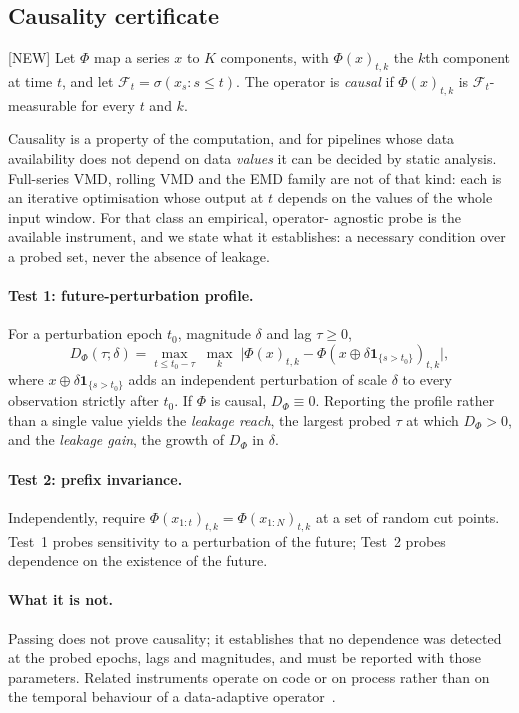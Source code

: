 \documentclass[review,3p,times]{elsarticle}
\begin{document}
\subsection{Causality certificate}\label{sec:certificate}
\textsf{[NEW]} Let $\Phi$ map a series $x$ to $K$ components, with
$\Phi(x)_{t,k}$ the $k$th component at time $t$, and let
$\mathcal F_t=\sigma(x_s: s\le t)$. The operator is \emph{causal} if
$\Phi(x)_{t,k}$ is $\mathcal F_t$-measurable for every $t$ and $k$.

Causality is a property of the computation, and for pipelines whose data
availability does not depend on data \emph{values} it can be decided by static
analysis. Full-series VMD, rolling VMD and the EMD family are not of that
kind: each is an iterative optimisation whose output at $t$ depends on the
values of the whole input window. For that class an empirical, operator-
agnostic probe is the available instrument, and we state what it establishes:
a necessary condition over a probed set, never the absence of leakage.

\paragraph{Test 1: future-perturbation profile.}
For a perturbation epoch $t_0$, magnitude $\delta$ and lag $\tau\ge0$,
\begin{equation}
D_\Phi(\tau;\delta)=
\max_{t\le t_0-\tau}\;\max_k\;
\bigl|\Phi(x)_{t,k}-\Phi\!\left(x\oplus\delta\mathbf 1_{\{s>t_0\}}\right)_{t,k}\bigr| ,
\label{eq:profile}
\end{equation}
where $x\oplus\delta\mathbf 1_{\{s>t_0\}}$ adds an independent perturbation of
scale $\delta$ to every observation strictly after $t_0$. If $\Phi$ is causal,
$D_\Phi\equiv0$. Reporting the profile rather than a single value yields the
\emph{leakage reach}, the largest probed $\tau$ at which $D_\Phi>0$, and the
\emph{leakage gain}, the growth of $D_\Phi$ in $\delta$.

\paragraph{Test 2: prefix invariance.}
Independently, require $\Phi(x_{1:t})_{t,k}=\Phi(x_{1:N})_{t,k}$ at a set of
random cut points. Test~1 probes sensitivity to a perturbation of the future;
Test~2 probes dependence on the existence of the future.

\paragraph{What it is not.} Passing does not prove causality; it establishes
that no dependence was detected at the probed epochs, lags and magnitudes, and
must be reported with those parameters. Related instruments operate on code or
on process rather than on the temporal behaviour of a data-adaptive
operator~\cite{kapoor2023,kaufman2012}.
\end{document}
